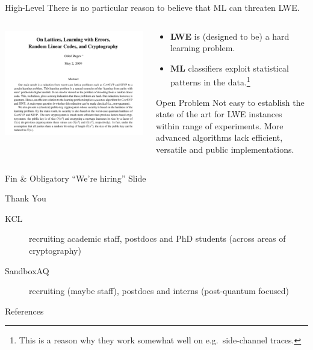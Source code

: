 \documentclass[xcolor=table,10pt,aspectratio=169]{beamer}
\begin{document}
\begin{frame}[label={sec:orgd4d4e8f}]{High-Level}
There is no particular reason to believe that ML can threaten LWE.

\begin{columns}
\begin{column}{0.6\columnwidth}
\begin{center}
\includegraphics[width=.9\linewidth]{./regev-hard-learning-problems.png}
\end{center}
\end{column}


\begin{column}{0.4\columnwidth}
\begin{itemize}
\item \textbf{LWE} is (designed to be) a hard learning problem.
\item \textbf{ML} classifiers exploit statistical patterns in the data.\footnote{This is a reason why they work somewhat well on e.g. side-channel traces.}
\end{itemize}

\begin{alertblock}{Open Problem}
Not easy to establish the state of the art for LWE instances within range of experiments. More advanced algorithms lack efficient, versatile and public implementations.
\end{alertblock}
\end{column}
\end{columns}
\end{frame}

\begin{frame}[label={sec:org8c6f713},standout]{Fin \& Obligatory ``We're hiring'' Slide}
\begin{center}
\Huge \alert{Thank You}
\end{center}

\begin{description}
\item[{KCL}] recruiting academic staff, postdocs and PhD students (across areas of cryptography)
\item[{SandboxAQ}] recruiting (maybe staff), postdocs and interns (post-quantum focused)
\end{description}
\end{frame}

\begin{frame}[allowframebreaks]{References}
\renewcommand*{\bibfont}{\scriptsize}
\printbibliography[heading=none]
\end{frame}
\end{document}
